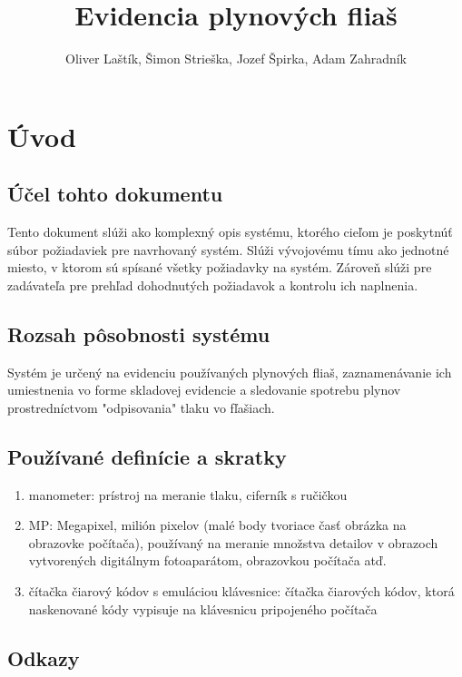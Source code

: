 \documentclass{zah}
\title{Evidencia plynových fliaš}
\author{Oliver Laštík, Šimon Strieška, Jozef Špirka, Adam Zahradník}
\begin{document}
\maketitle

\tableofcontents
\cleardoublepage

\section{Úvod}

\subsection{Účel tohto dokumentu}

Tento dokument slúži ako komplexný opis systému, ktorého cieľom je poskytnúť súbor požiadaviek pre navrhovaný systém. Slúži vývojovému tímu ako jednotné miesto, v ktorom sú spísané všetky požiadavky na systém. Zároveň slúži pre zadávateľa pre prehľad dohodnutých požiadavok a kontrolu ich naplnenia.

\subsection{Rozsah pôsobnosti systému}

Systém je určený na evidenciu používaných plynových fliaš, zaznamenávanie ich umiestnenia vo forme skladovej evidencie a sledovanie spotrebu plynov prostredníctvom "odpisovania" tlaku vo fľašiach.

\subsection{Používané definície a skratky}

\begin{enumerate}
	\item manometer: prístroj na meranie tlaku, ciferník s ručičkou
 	\item MP: Megapixel, milión pixelov (malé body tvoriace časť obrázka na obrazovke počítača), používaný na meranie množstva detailov v obrazoch vytvorených digitálnym fotoaparátom, obrazovkou počítača atď.
 	\item čítačka čiarový kódov s emuláciou klávesnice: čítačka čiarových kódov, ktorá naskenované kódy vypisuje na klávesnicu pripojeného počítača
\end{enumerate}

\subsection{Odkazy}
\end{document}
